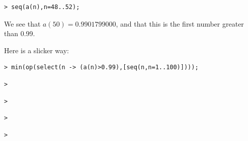 \documentclass{article}
\begin{document}
\begin{lstlisting}
> seq(a(n),n=48..52);
\end{lstlisting}
\begin{Maple Normal}
We see that 
$a (50)= 0.9901799000$, and that this is the first number greater than 0.99.\


\end{Maple Normal}
\begin{Maple Normal}
Here is a slicker way:
\end{Maple Normal}
\begin{lstlisting}
> min(op(select(n -> (a(n)>0.99),[seq(n,n=1..100)])));
\end{lstlisting}
\begin{lstlisting}
> 
\end{lstlisting}
\begin{lstlisting}
> 
\end{lstlisting}
\begin{lstlisting}
> 
\end{lstlisting}
\begin{lstlisting}
> 
\end{lstlisting}
\end{document}
